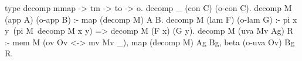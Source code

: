 \begin{elpicode}
  type decomp mmap -> tm -> to -> o.
  decomp _ (con C)  (o-con C).
  decomp M (app A) (o-app B) :- map (decomp M) A B.
  decomp M (lam F) (o-lam G) :- 
    pi x y\ (pi M\ decomp M x y) => decomp M (F x) (G y).
  decomp M (uva Mv Ag) R :-
    mem M (ov Ov <-> mv Mv _), 
    map (decomp M) Ag Bg,
    beta (o-uva Ov) Bg R.
\end{elpicode}
